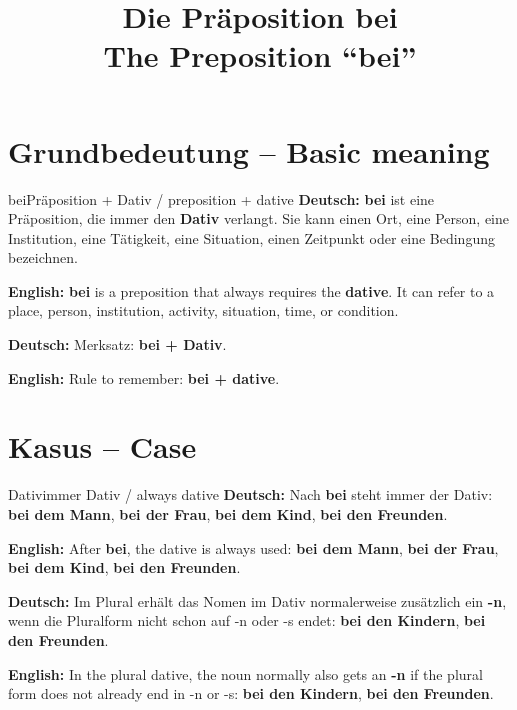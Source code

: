 \documentclass[a4paper,11pt]{article}
\title{Die Präposition \glqq bei\grqq\\\large The Preposition ``bei''}
\date{}
\newcommand{\GermanText}[1]{\textbf{Deutsch: }#1\par}
\newcommand{\EnglishText}[1]{{\small\color{SoftGray}\textbf{English: }#1\par}}
\begin{document}
\maketitle
\tableofcontents
\newpage

\section{Grundbedeutung -- Basic meaning}
\begin{grammarentry}{bei}{Präposition + Dativ / preposition + dative}
\GermanText{\textbf{bei} ist eine Präposition, die immer den \textbf{Dativ} verlangt. Sie kann einen Ort, eine Person, eine Institution, eine Tätigkeit, eine Situation, einen Zeitpunkt oder eine Bedingung bezeichnen.}
\EnglishText{\textbf{bei} is a preposition that always requires the \textbf{dative}. It can refer to a place, person, institution, activity, situation, time, or condition.}
\GermanText{Merksatz: \textbf{bei + Dativ}.}
\EnglishText{Rule to remember: \textbf{bei + dative}.}
\end{grammarentry}

\section{Kasus -- Case}
\begin{grammarentry}{Dativ}{immer Dativ / always dative}
\GermanText{Nach \textbf{bei} steht immer der Dativ: \textbf{bei dem Mann}, \textbf{bei der Frau}, \textbf{bei dem Kind}, \textbf{bei den Freunden}.}
\EnglishText{After \textbf{bei}, the dative is always used: \textbf{bei dem Mann}, \textbf{bei der Frau}, \textbf{bei dem Kind}, \textbf{bei den Freunden}.}
\GermanText{Im Plural erhält das Nomen im Dativ normalerweise zusätzlich ein \textbf{-n}, wenn die Pluralform nicht schon auf -n oder -s endet: \textbf{bei den Kindern}, \textbf{bei den Freunden}.}
\EnglishText{In the plural dative, the noun normally also gets an \textbf{-n} if the plural form does not already end in -n or -s: \textbf{bei den Kindern}, \textbf{bei den Freunden}.}
\end{grammarentry}
\end{document}
